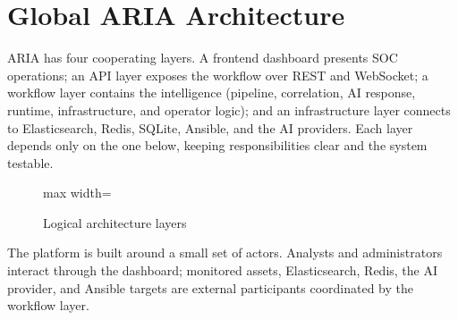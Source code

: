 \section{Global ARIA Architecture}

ARIA has four cooperating layers. A frontend dashboard presents SOC operations; an API layer exposes the workflow over REST and WebSocket; a workflow layer contains the intelligence (pipeline, correlation, AI response, runtime, infrastructure, and operator logic); and an infrastructure layer connects to Elasticsearch, Redis, SQLite, Ansible, and the AI providers. Each layer depends only on the one below, keeping responsibilities clear and the system testable.

\begin{figure}[H]
\centering
\begin{adjustbox}{max width=\textwidth}\end{adjustbox}
\caption{Logical architecture layers}
\end{figure}

The platform is built around a small set of actors. Analysts and administrators interact through the dashboard; monitored assets, Elasticsearch, Redis, the AI provider, and Ansible targets are external participants coordinated by the workflow layer.

